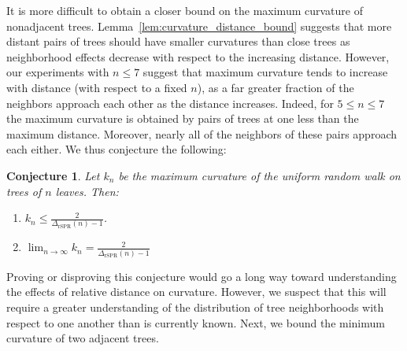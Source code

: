 \documentclass[11pt,onecolumn,conference]{IEEEtran}
\newtheorem{conjecture}[theorem]{Conjecture}
\begin{document}
It is more difficult to obtain a closer bound on the maximum curvature of nonadjacent trees.
Lemma~\ref{lem:curvature_distance_bound} suggests that more distant pairs of trees should have smaller curvatures than close trees as neighborhood effects decrease with respect to the increasing distance.
However, our experiments with $n \le 7$ suggest that maximum curvature tends to increase with distance (with respect to a fixed $n$), as a far greater fraction of the neighbors approach each other as the distance increases.
Indeed, for $5 \le n \le 7$ the maximum curvature is obtained by pairs of trees at one less than the maximum distance.
Moreover, nearly all of the neighbors of these pairs approach each either.
We thus conjecture the following:
\begin{conjecture}
	Let $k_n$ be the maximum curvature of the uniform random walk on trees of $n$ leaves.
	Then:
	\begin{enumerate}
		\item $k_n \le \frac{2}{\Delta_{\text{rSPR}}(n)-1}$.
		\item $\lim_{n\rightarrow\infty} k_n  = \frac{2}{\Delta_{\text{rSPR}}(n)-1}$
	\end{enumerate}
\end{conjecture}
Proving or disproving this conjecture would go a long way toward understanding the effects of relative distance on curvature.
However, we suspect that this will require a greater understanding of the distribution of tree neighborhoods with respect to one another than is currently known.
Next, we bound the minimum curvature of two adjacent trees.
\end{document}
